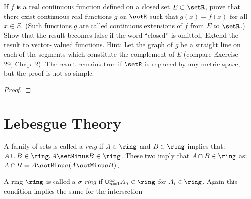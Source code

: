 \documentclass[12pt, letterpaper]{paper}
\begin{document}
\begin{question}
  If $f$ is a real continuous function defined on a closed set
  $E \subset \setR$, prove that there exist continuous real functions
  $g$ on $\setR$ such that $g(x) = f(x)$ for all $x \in E$. (Such
  functions $g$ are called continuous extensions of $f$ from $E$ to
  $\setR$.) Show that the result becomes false if the word ``closed''
  is omitted. Extend the result to vector- valued functions. Hint: Let
  the graph of $g$ be a straight line on each of the segments which
  constitute the complement of $E$ (compare Exercise 29, Chap. 2).
  The result remains true if $\setR$ is replaced by any metric space,
  but the proof is not so simple.

  \begin{proof}
    
  \end{proof}
\end{question}

\begin{question}
  
\end{question}

\section{Lebesgue Theory}

A family of sets is called a \emph{ring} if $A \in \ring$ and $B \in
\ring$ implies that: $A \cup B \in \ring, A \setMinus B \in \ring$. These two
imply that $A \cap B \in \ring$ as: $A \cap B = A \setMinus ( A \setMinus B)$.

A ring $\ring$ is called a \emph{$\sigma$-ring} if $\cup_{n=1}^{\infty} A_n \in
\ring$ for $A_i \in \ring$. Again this condition implies the same for
the intersection.
\end{document}
